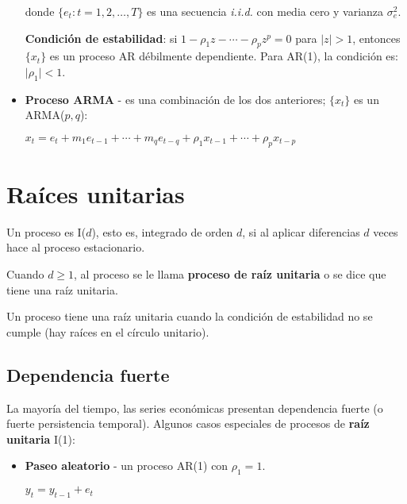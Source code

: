 \documentclass[10pt, a4paper, landscape]{article}
\begin{document}
\begin{multicols}{3}
\begin{itemize}[leftmargin=*]
			donde $\lbrace e_{t}: t = 1, 2, \ldots, T \rbrace$ es una secuencia \textsl{i.i.d.} con media cero y varianza $\sigma^{2}_{e}$.
			
			\textbf{Condición de estabilidad}: si $1 - \rho_{1} z - \cdots - \rho_{p} z^{p} = 0$ para $\lvert z \rvert > 1$, entonces $\lbrace x_{t} \rbrace$ es un proceso AR débilmente dependiente. Para AR(1), la condición es: $\lvert \rho_{1} \rvert < 1$.
		
			\item \textbf{Proceso ARMA} - es una combinación de los dos anteriores; $\lbrace x_{t} \rbrace$ es un ARMA($p, q$):
			
			\begin{center}
				$x_{t} = e_{t} + m_{1} e_{t - 1} + \cdots + m_{q} e_{t - q} + \rho_{1} x_{t - 1} + \cdots + \rho_{p} x_{t - p}$
			\end{center}
		\end{itemize}
		
		\columnbreak
		
		\section*{Raíces unitarias}
		
		Un proceso es I($d$), esto es, integrado de orden $d$, si al aplicar diferencias $d$ veces hace al proceso estacionario.
		
		Cuando $d \geq 1$, al proceso se le llama \textbf{proceso de raíz unitaria} o se dice que tiene una raíz unitaria.
		
		Un proceso tiene una raíz unitaria cuando la condición de estabilidad no se cumple (hay raíces en el círculo unitario).
		
		\subsection*{Dependencia fuerte}
		
		La mayoría del tiempo, las series económicas presentan dependencia fuerte (o fuerte persistencia temporal). Algunos casos especiales de procesos de \textbf{raíz unitaria} I(1):
		
		\begin{itemize}[leftmargin=*]
			\item \textbf{Paseo aleatorio} - un proceso AR(1) con $\rho_{1} = 1$.
			
			\begin{center}
				$y_{t} = y_{t - 1} + e_{t}$
			\end{center}
			

\end{itemize}
\end{multicols}
\end{document}
